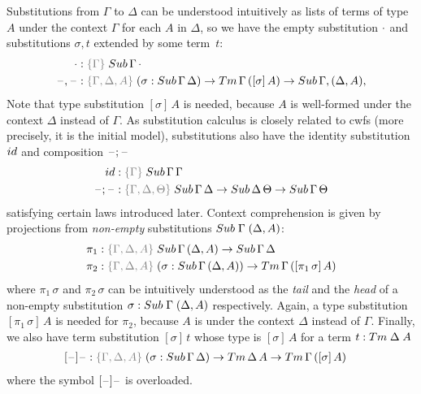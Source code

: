 \documentclass[a4paper,UKenglish,numberwithinsect,cleveref,thm-restate]{lipics-v2021}
\begin{document}
Substitutions from $\Gamma$ to $\Delta$ can be understood intuitively as lists of terms of type $A$ under the context $\Gamma$ for each $A$ in $\Delta$, so we have the empty substitution $\cdot$ and substitutions $\sigma, t$ extended by some term~$t$:
\begin{alignat*}{3}
  \emptysub & : \implicit{\Gamma}\;\Sub\,\Gamma\,\emptyctx \\
  \blank,\blank & : \implicit{\Gamma, \Delta, A}\;(\sigma : \Sub\,\Gamma\,\Delta) \to \Tm\,\Gamma\,([ \sigma ]\, A) \to \Sub\,\Gamma,(\Delta, A),
\end{alignat*}
Note that type substitution $[\sigma]\,A$ is needed, because $A$ is well-formed under the context $\Delta$ instead of $\Gamma$.
As substitution calculus is closely related to cwfs (more precisely, it is the initial model), substitutions also have the identity substitution $\idS$ and composition $\mathord{\hspace{1pt}\text{--}\hspace{1pt}};\mathord{\hspace{1pt}\text{--}\hspace{1pt}}$
\begin{alignat*}{3}
  \idS & : \implicit{\Gamma}\;\Sub\,\Gamma\,\Gamma \\
  \blank;\blank & : \implicit{\Gamma, \Delta, \Theta}\;\Sub\,\Gamma\,\Delta \to \Sub\,\Delta\,\Theta \to \Sub\,\Gamma\,\Theta \\
\end{alignat*}
satisfying certain laws introduced later.
Context comprehension is given by projections from \emph{non-empty} substitutions $\Sub\;\Gamma\;(\Delta, A)$:
\begin{alignat*}{3}
  \pi_1 & : \implicit{\Gamma, \Delta, A}\;\Sub\,\Gamma\,(\Delta, A) \to \Sub\,\Gamma\,\Delta \\
  \pi_2 & : \implicit{\Gamma, \Delta, A}\;(\sigma : \Sub\,\Gamma\,(\Delta, A)) \to \Tm\,\Gamma\,([ \pi_1\,\sigma ]\, A)
\end{alignat*}
where $\pi_1\,\sigma$ and $\pi_2\,\sigma$ can be intuitively understood as the \emph{tail} and the \emph{head} of a non-empty substitution $\sigma : \Sub\;\Gamma\;(\Delta, A)$ respectively.
Again, a type substitution $[\pi_1\,\sigma]\,A$ is needed for $\pi_2$, because $A$ is under the context $\Delta$ instead of $\Gamma$.
Finally, we also have term substitution $[\sigma]\,t$ whose type is $[\sigma]\,A$ for a term $t : \Tm\;\Delta\;A$
\begin{alignat*}{3}
  [\blank] \blank & : \implicit{\Gamma,\Delta, A}\;(\sigma : \Sub\,\Gamma\,\Delta) \to \Tm\,\Delta\,A \to \Tm\,\Gamma\,([\sigma]\, A)
\end{alignat*}
where the symbol $[\mathord{\hspace{1pt}\text{--}\hspace{1pt}}]\mathord{\hspace{1pt}\text{--}\hspace{1pt}}$ is overloaded.
\end{document}

